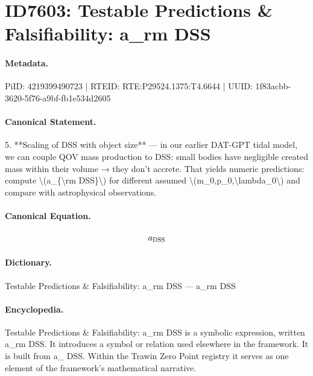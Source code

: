 \section*{ID7603: Testable Predictions \& Falsifiability: a\_rm DSS}
\paragraph{Metadata.}
PiID: 4219399490723 | RTEID: RTE:P29524.1375:T4.6644 | UUID: 1f83acbb-3620-5f76-a9bf-fb1e534d2605

\paragraph{Canonical Statement.}
5. **Scaling of DSS with object size** — in our earlier DAT-GPT tidal model, we can couple QOV mass production to DSS: small bodies have negligible created mass within their volume → they don’t accrete. That yields numeric predictions: compute \textbackslash{}(a\_\{\textbackslash{}rm DSS\}\textbackslash{}) for different assumed \textbackslash{}(m\_0,p\_0,\textbackslash{}lambda\_0\textbackslash{}) and compare with astrophysical observations.

\paragraph{Canonical Equation.}
\[
a_{\rm DSS}
\]

\paragraph{Dictionary.}
Testable Predictions \& Falsifiability: a\_rm DSS — a\_rm DSS

\paragraph{Encyclopedia.}
Testable Predictions \& Falsifiability: a\_rm DSS is a symbolic expression, written a\_rm DSS. It introduces a symbol or relation used elsewhere in the framework. It is built from a\_ DSS. Within the Trawin Zero Point registry it serves as one element of the framework's mathematical narrative.
